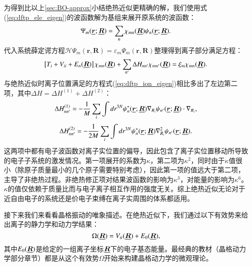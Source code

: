 为得到比以上\ref{sec:BO-approx}小结绝热近似更精确的解，我们使用式(\ref{eq:dftp_ele_eigen})的波函数解为基组来展开原系统的波函数：
\begin{equation}
  \Psi_m(\underline{\bm{r}};\underline{\bm{R}}) = \sum_n \chi_{mn}(\underline{\bm{R}})\psi_n(\underline{\bm{r}};\underline{\bm{R}}).
\end{equation}
代入系统薛定谔方程$\mathcal{H} \Psi_m(\bm{r},\bm{R})=\mathcal{\varepsilon}_m \Psi_m(\bm{r},\bm{R})$整理得到离子部分满足方程：
\begin{equation}
  \left[ T_i + V_{ii} + E_n(\underline{\bm{R}}) \right] \chi_{mn}(\underline{\bm{R}}) + \sum_{n'}\Delta H_{nn'}\chi_{mn'}(\underline{\bm{R}}) = \xi_m \chi_{mn} (\underline{\bm{R}}).
\end{equation}
与绝热近似时离子位置满足的方程式(\ref{eq:dftp_ion_eigen})相比多出了左边第二项，其中$\Delta H=\Delta H^{(1)} + \Delta H^{(2)}$：
\begin{equation}
  \Delta H_{nn'}^{(1)} = -\frac{1}{M}\sum_i \int dr^{3N}\psi_n^*(\underline{\bm{r}};\underline{\bm{R}})\nabla_{R_i}\psi_{n'}(\underline{\bm{r}};\underline{\bm{R}})\cdot \nabla_{R_i},
\end{equation}
\begin{equation}
  \Delta H_{nn'}^{(2)} = -\frac{1}{2M}\sum_i \int dr^{3N}\psi_n^*(\underline{\bm{r}};\underline{\bm{R}})\nabla^2_{R_i}\psi_{n'}(\underline{\bm{r}};\underline{\bm{R}}).
\end{equation}
这两项中都有电子波函数对离子实位置的偏导，因此包含了离子实位置移动所导致的电子子系统的激发情况。第一项展开的系数为$\kappa$，第二项为$\kappa^2$，同时由于$\kappa$值很小（除原子质量最小的几个原子需要特别考虑），因此第一项的值远大于第二项，主导了非绝热过程。非绝热修正项对结果波函数的影响为$\kappa^3$，对能量的影响为$\kappa^6$。$\kappa$的值仅依赖于质量比而与电子离子相互作用的强度无关。综上绝热近似无论对于近自由电子的系统还是价电子束缚在离子实周围的体系都适用。

接下来我们来看看晶格振动的唯象描述。在绝热近似下，我们通过以下有效势来给出离子的静力学和动力学结果：
\begin{equation}\label{eq:effective_potential}
  \Omega(\underline{\bm{R}}) = V_{ii}(\underline{\bm{R}}) + E_0(\underline{\bm{R}}),
\end{equation}
其中$E_0(\underline{\bm{R}})$是给定的一组离子坐标$\underline{\bm{R}}$下的电子基态能量。最经典的教材\cite{born1954dynamical,bottger1983principles}（晶格动力学部分章节）都是从这个有效势$\Omega$开始来构建晶格动力学的微观理论。

